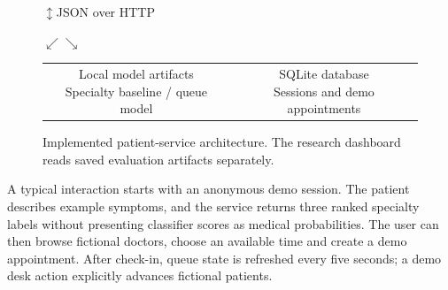 \documentclass{tietreport}
\begin{document}
\begin{figure}[H]\centering\small
{}
\par\vspace{0.15cm}$\updownarrow$\quad JSON over HTTP\par\vspace{0.15cm}
\par\vspace{0.15cm}$\swarrow$\hspace{3cm}$\searrow$\par\vspace{0.15cm}
\begin{tabular}{cc}
\fbox{\parbox{0.39\textwidth}{\centering Local model artifacts\\Specialty baseline / queue model}} &
\fbox{\parbox{0.39\textwidth}{\centering SQLite database\\Sessions and demo appointments}}
\end{tabular}
\caption{Implemented patient-service architecture. The research dashboard reads saved evaluation artifacts separately.}
\end{figure}

A typical interaction starts with an anonymous demo session. The patient describes example symptoms, and the service returns three ranked specialty labels without presenting classifier scores as medical probabilities. The user can then browse fictional doctors, choose an available time and create a demo appointment. After check-in, queue state is refreshed every five seconds; a demo desk action explicitly advances fictional patients.
\end{document}
